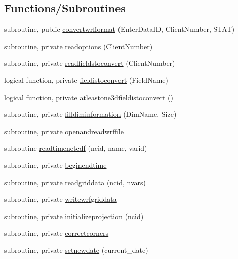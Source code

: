 \subsection*{Functions/\+Subroutines}
\begin{DoxyCompactItemize}
\item 
subroutine, public \mbox{\hyperlink{namespacemodulewrfformat_aa35fbb60f9455409be248675ba032799}{convertwrfformat}} (Enter\+Data\+ID, Client\+Number, S\+T\+AT)
\item 
subroutine, private \mbox{\hyperlink{namespacemodulewrfformat_a00bbd242b402a9ccd03ef1e1f7c2721e}{readoptions}} (Client\+Number)
\item 
subroutine, private \mbox{\hyperlink{namespacemodulewrfformat_a6acfc9c1ce2d45f5a0a6187e1e8083f8}{readfieldstoconvert}} (Client\+Number)
\item 
logical function, private \mbox{\hyperlink{namespacemodulewrfformat_a8116c1c7ac79eeffc8e9a9316b030276}{fieldistoconvert}} (Field\+Name)
\item 
logical function, private \mbox{\hyperlink{namespacemodulewrfformat_a84c66dd2bcabd5f772f74e52544536f7}{atleastone3dfieldistoconvert}} ()
\item 
subroutine, private \mbox{\hyperlink{namespacemodulewrfformat_aad3ae96f01cad78355724f71c1705c80}{filldiminformation}} (Dim\+Name, Size)
\item 
subroutine, private \mbox{\hyperlink{namespacemodulewrfformat_ace4676af115f32ceeda15123d47bd5c8}{openandreadwrffile}}
\item 
subroutine \mbox{\hyperlink{namespacemodulewrfformat_af33b325d2707c25986c4337ea9954b91}{readtimenetcdf}} (ncid, name, varid)
\item 
subroutine, private \mbox{\hyperlink{namespacemodulewrfformat_a28558eb5842cfa6977bae48d0fd73c4e}{beginendtime}}
\item 
subroutine, private \mbox{\hyperlink{namespacemodulewrfformat_a0a9c15502f5f361afd382196884a739d}{readgriddata}} (ncid, nvars)
\item 
subroutine, private \mbox{\hyperlink{namespacemodulewrfformat_ac70c0a00b2fe8eb641ec2a6846ed4363}{writewrfgriddata}}
\item 
subroutine, private \mbox{\hyperlink{namespacemodulewrfformat_a4a00c0e3d836f215b0275950c3cc307c}{initializeprojection}} (ncid)
\item 
subroutine, private \mbox{\hyperlink{namespacemodulewrfformat_a79b585a2293851b1ed94e43076fb4779}{correctcorners}}
\item 
subroutine, private \mbox{\hyperlink{namespacemodulewrfformat_a059682013c76ca30c57ffaaa268179f3}{setnewdate}} (current\+\_\+date)

\end{DoxyCompactItemize}
